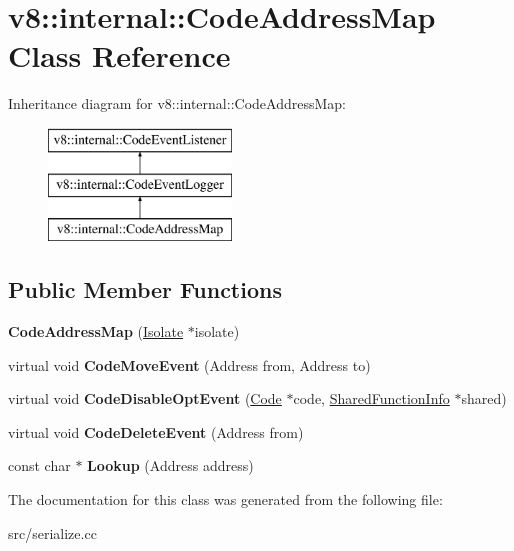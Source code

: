 \hypertarget{classv8_1_1internal_1_1_code_address_map}{}\section{v8\+:\+:internal\+:\+:Code\+Address\+Map Class Reference}
\label{classv8_1_1internal_1_1_code_address_map}
Inheritance diagram for v8\+:\+:internal\+:\+:Code\+Address\+Map\+:\begin{figure}[H]
\begin{center}
\leavevmode
\includegraphics[height=3.000000cm]{classv8_1_1internal_1_1_code_address_map}
\end{center}
\end{figure}
\subsection*{Public Member Functions}
\begin{DoxyCompactItemize}
\item 
\hypertarget{classv8_1_1internal_1_1_code_address_map_ae6049c6139e77f95124fbf0d03b1738b}{}{\bfseries Code\+Address\+Map} (\hyperlink{classv8_1_1internal_1_1_isolate}{Isolate} $\ast$isolate)\label{classv8_1_1internal_1_1_code_address_map_ae6049c6139e77f95124fbf0d03b1738b}

\item 
\hypertarget{classv8_1_1internal_1_1_code_address_map_adbb528974267582ee3465f8a88997bfa}{}virtual void {\bfseries Code\+Move\+Event} (Address from, Address to)\label{classv8_1_1internal_1_1_code_address_map_adbb528974267582ee3465f8a88997bfa}

\item 
\hypertarget{classv8_1_1internal_1_1_code_address_map_a67693248df7b49535269a0ebccc3d0bb}{}virtual void {\bfseries Code\+Disable\+Opt\+Event} (\hyperlink{classv8_1_1internal_1_1_code}{Code} $\ast$code, \hyperlink{classv8_1_1internal_1_1_shared_function_info}{Shared\+Function\+Info} $\ast$shared)\label{classv8_1_1internal_1_1_code_address_map_a67693248df7b49535269a0ebccc3d0bb}

\item 
\hypertarget{classv8_1_1internal_1_1_code_address_map_a475b65ecba426849a858605d1783862b}{}virtual void {\bfseries Code\+Delete\+Event} (Address from)\label{classv8_1_1internal_1_1_code_address_map_a475b65ecba426849a858605d1783862b}

\item 
\hypertarget{classv8_1_1internal_1_1_code_address_map_a7390ba26a90e3c63b006d79b874d59a4}{}const char $\ast$ {\bfseries Lookup} (Address address)\label{classv8_1_1internal_1_1_code_address_map_a7390ba26a90e3c63b006d79b874d59a4}

\end{DoxyCompactItemize}


The documentation for this class was generated from the following file\+:\begin{DoxyCompactItemize}
\item 
src/serialize.\+cc\end{DoxyCompactItemize}
